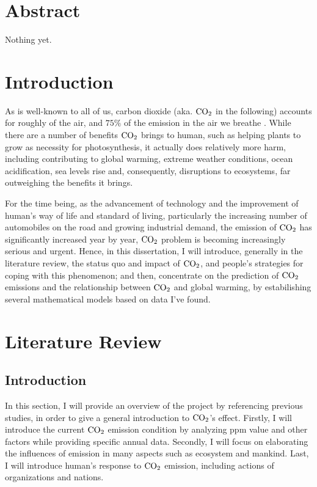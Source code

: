 \documentclass[12pt,a4paper]{article}
\begin{document}
    \maketitle
    \newpage
    \tableofcontents    
    \newpage  
    
    \section{Abstract}
    Nothing yet.
    \section{Introduction}
    As is well-known to all of us, carbon dioxide (aka. $\ce{CO2}$ in the following) accounts for roughly \label{data} of the air, and $75\%$ of the emission in the air we breathe \label{cite}. While there are a number of benefits $\ce{CO2}$ brings to human, such as helping plants to grow as necessity for photosynthesis, it actually does relatively more harm, including contributing to global warming, extreme weather conditions, ocean acidification, sea levels rise and, consequently, disruptions to ecosystems, far outweighing the benefits it brings.

    For the time being, as the advancement of technology and the improvement of human's way of life and standard of living, particularly the increasing number of automobiles on the road and growing industrial demand, the emission of $\ce{CO2}$ has significantly increased year by year, 
    $\ce{CO2}$ problem is becoming increasingly serious and urgent. Hence, in this dissertation, I will introduce, generally in the literature review, the status quo and impact of $\ce{CO2}$, and people's strategies for coping with this phenomenon; and then, concentrate on the prediction of $\ce{CO2}$ emissions and the relationship between $\ce{CO2}$ and global warming, by estabilishing several mathematical models based on data I've found.
        
    \section{Literature Review}
    \subsection{Introduction}
    In this section, I will provide an overview of the project by referencing previous studies, in order to give a general introduction to $\ce{CO2}$'s effect. Firstly, I will introduce the current $\ce{CO2}$ emission condition by analyzing ppm value and other factors while providing specific annual data. Secondly, I will focus on elaborating the influences of  emission in many aspects such as ecosystem and mankind. Last, I will introduce human's response to  $\ce{CO2}$ emission, including actions of organizations and nations.
    
\end{document}
